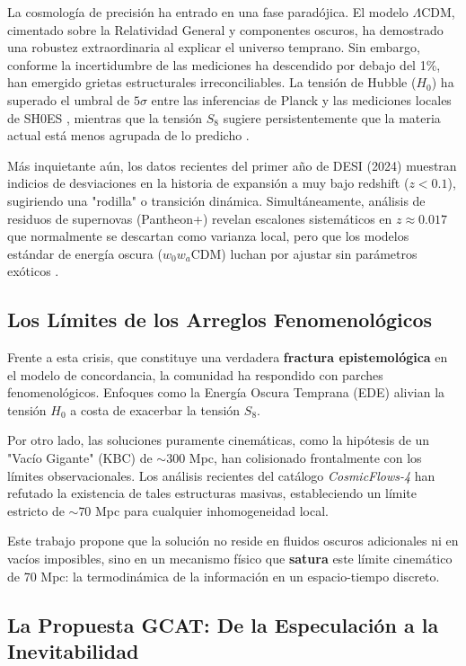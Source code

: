 \documentclass[12pt, a4paper]{article}
\theoremstyle{plain}
\theoremstyle{definition}
\begin{document}
La cosmología de precisión ha entrado en una fase paradójica. El modelo $\Lambda$CDM, cimentado sobre la Relatividad General y componentes oscuros, ha demostrado una robustez extraordinaria al explicar el universo temprano. Sin embargo, conforme la incertidumbre de las mediciones ha descendido por debajo del 1\%, han emergido grietas estructurales irreconciliables. La tensión de Hubble ($H_0$) ha superado el umbral de $5\sigma$ entre las inferencias de Planck y las mediciones locales de SH0ES \cite{Riess2022}, mientras que la tensión $S_8$ sugiere persistentemente que la materia actual está menos agrupada de lo predicho \cite{KiDS2021, DES2022}.

Más inquietante aún, los datos recientes del primer año de DESI (2024) muestran indicios de desviaciones en la historia de expansión a muy bajo redshift ($z < 0.1$), sugiriendo una "rodilla" o transición dinámica. Simultáneamente, análisis de residuos de supernovas (Pantheon+) revelan escalones sistemáticos en $z \approx 0.017$ que normalmente se descartan como varianza local, pero que los modelos estándar de energía oscura ($w_0w_a$CDM) luchan por ajustar sin parámetros exóticos \cite{DESI2024, Brout2022}.

\subsection{Los Límites de los Arreglos Fenomenológicos}

Frente a esta crisis, que constituye una verdadera \textbf{fractura epistemológica} en el modelo de concordancia, la comunidad ha respondido con parches fenomenológicos. Enfoques como la Energía Oscura Temprana (EDE) alivian la tensión $H_0$ a costa de exacerbar la tensión $S_8$. 

Por otro lado, las soluciones puramente cinemáticas, como la hipótesis de un "Vacío Gigante" (KBC) de $\sim 300$ Mpc, han colisionado frontalmente con los límites observacionales. Los análisis recientes del catálogo \textit{CosmicFlows-4} \cite{Mazurenko2024} han refutado la existencia de tales estructuras masivas, estableciendo un límite estricto de $\sim 70$ Mpc para cualquier inhomogeneidad local.

Este trabajo propone que la solución no reside en fluidos oscuros adicionales ni en vacíos imposibles, sino en un mecanismo físico que \textbf{satura} este límite cinemático de 70 Mpc: la termodinámica de la información en un espacio-tiempo discreto.

\subsection{La Propuesta GCAT: De la Especulación a la Inevitabilidad}
\end{document}
